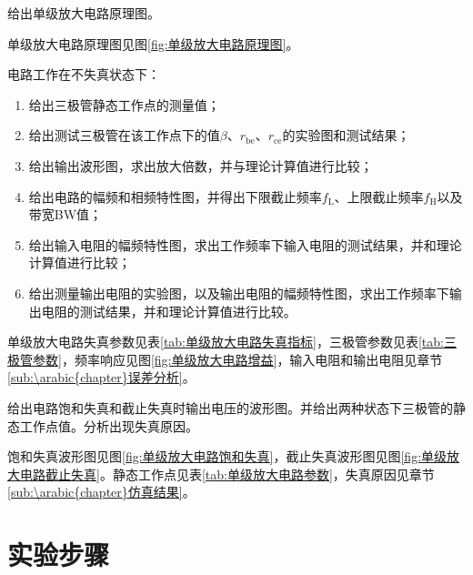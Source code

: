 \begin{Exercise}
	给出单级放大电路原理图。
\end{Exercise}

\begin{Answer}
	单级放大电路原理图见图\ref{fig:单级放大电路原理图}。
\end{Answer}

\begin{Exercise}
	电路工作在不失真状态下：

	\begin{enumerate}
		\item 给出三极管静态工作点的测量值；
		\item 给出测试三极管在该工作点下的值$ \beta $、$ r_\mathrm{be} $、$ r_\mathrm{ce} $的实验图和测试结果；
		\item 给出输出波形图，求出放大倍数，并与理论计算值进行比较；
		\item 给出电路的幅频和相频特性图，并得出下限截止频率$ f_\mathrm{L} $、上限截止频率$ f_\mathrm{H} $以及带宽BW值；
		\item 给出输入电阻的幅频特性图，求出工作频率下输入电阻的测试结果，并和理论计算值进行比较；
		\item 给出测量输出电阻的实验图，以及输出电阻的幅频特性图，求出工作频率下输出电阻的测试结果，并和理论计算值进行比较。
	\end{enumerate}

\end{Exercise}

\begin{Answer}
	单级放大电路失真参数见表\ref{tab:单级放大电路失真指标}，三极管参数见表\ref{tab:三极管参数}，频率响应见图\ref{fig:单级放大电路增益}，输入电阻和输出电阻见章节\ref{sub:\arabic{chapter}误差分析}。
\end{Answer}

\begin{Exercise}
	给出电路饱和失真和截止失真时输出电压的波形图。并给出两种状态下三极管的静态工作点值。分析出现失真原因。
\end{Exercise}

\begin{Answer}
	饱和失真波形图见图\ref{fig:单级放大电路饱和失真}，截止失真波形图见图\ref{fig:单级放大电路截止失真}。静态工作点见表\ref{tab:单级放大电路参数}，失真原因见章节\ref{sub:\arabic{chapter}仿真结果}。
\end{Answer}

\section{实验步骤}%
\label{sec:\arabic{chapter}实验步骤}

